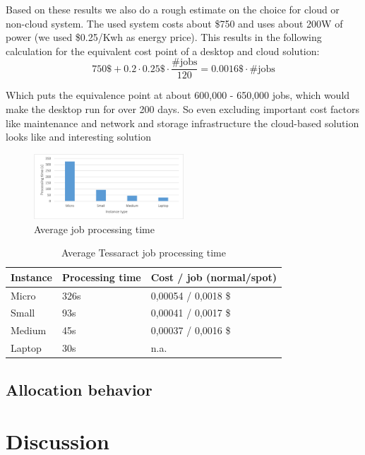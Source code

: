 \documentclass[a4paper]{IEEEtran}
\begin{document}
Based on these results we also do a rough estimate on the choice for cloud or non-cloud system. The used system costs about \$750 and uses about 200W of power (we used \$0.25/Kwh as energy price). This results in the following calculation for the equivalent cost point of a desktop and cloud solution:
$$
750\$ + 0.2 \cdot 0.25\$ \cdot \frac{\text{\#jobs}}{120} = 0.0016\$ \cdot \text{\#jobs}
$$

Which puts the equivalence point at about 600,000 - 650,000 jobs, which would make the desktop run for over 200 days. So even excluding important cost factors like maintenance and network and storage infrastructure the cloud-based solution looks like and interesting solution 

\begin{figure}
\centering
\includegraphics[width=0.5\textwidth]{"results-tessaract"}
\caption{Average job processing time}
\label{fig_tesperfresults}
\end{figure}

\begin{table}
\centering

\begin{tabular}{| l | l | l |}
\hline
Instance & Processing time & Cost / job (normal/spot) \\ \hline
Micro & 326s & 0,00054 / 0,0018 \$ \\ \hline
Small & 93s & 0,00041 / 0,0017 \$ \\ \hline
Medium & 45s & 0,00037 / 0,0016 \$ \\ \hline
Laptop & 30s & n.a. \\ \hline
\end{tabular}

\caption{Average Tessaract job processing time}
\label{tesperfresults}
\end{table}

\subsection{Allocation behavior}

\section{Discussion}
\end{document}
